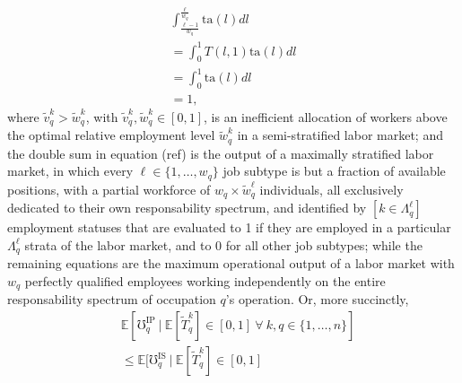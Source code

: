 \documentclass[hidelinks, nonatbib]{elsarticle}
\begin{document}
\begin{enumerate}
\begin{enumerate}
\begin{enumerate}
\begin{align}
                \int_{
                    \frac{\ell - 1}{w_q}
                }^{
                    \frac{\ell}{w_q}
                }{
                    \text{ta}(l)
                    dl
                }
                \\
                =
                \int_{0}^{1}{
                    T(l,1)
                    \text{ta}(l)
                    dl
                }
                \\
                =
                \int_{0}^{1}{
                    \text{ta}(l)
                    dl
                }
                \\
                =
                1
                ,
            \end{align}
            where $\tilde{v}_{q}^{k} > \tilde{w}_{q}^{k}$, with $\tilde{v}_{q}^{k}, \tilde{w}_{q}^{k} \in [0,1]$, is an inefficient allocation of workers above the optimal relative employment level $\tilde{w}_{q}^{k}$ in a semi-stratified labor market; and the double sum in equation (ref) is the output of a maximally stratified labor market, in which every $\ell \in \{1, \dots, w_q\}$ job subtype is but a fraction of available positions, with a partial workforce of $w_q \times \tilde{w}_{q}^{\ell}$ individuals, all exclusively dedicated to their own responsability spectrum, and identified by $[k \in \Lambda_{q}^{\ell}]$ employment statuses that are evaluated to 1 if they are employed in a particular $\Lambda_{q}^{\ell}$ strata of the labor market, and to 0 for all other job subtypes; while the remaining equations are the maximum operational output of a labor market with $w_q$ perfectly qualified employees working independently on the entire responsability spectrum of occupation $q$'s operation. Or, more succinctly,
            \begin{align}
                &\mathbb{E}[
                    \mho_{q}^{\text{IP}}
                    \
                    |
                    \
                    \mathbb{E}[
                        \tilde{T}_{q}^{k}
                    ]
                    \in [0,1]
                    \
                    \forall
                    \
                    k,q \in \{1, \dots, n\}
                ]
                \\
                &\leq
                \mathbb{E}[
                    \mho_{q}^{\text{IS}}
                    \
                    |
                    \
                    \mathbb{E}[
                        \tilde{T}_{q}^{k}
                    ]
                    \in [0,1]

\end{align}
\end{enumerate}
\end{enumerate}
\end{enumerate}
\end{document}
